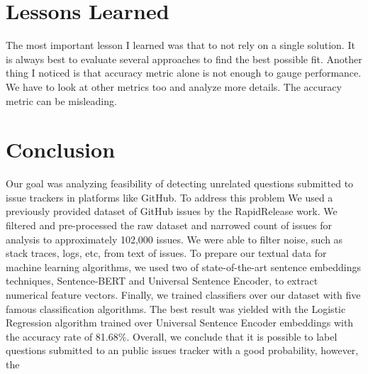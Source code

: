 \documentclass[conference]{IEEEtran}
\begin{document}
\section{Lessons Learned}
The most important lesson I learned was that to not rely on a single solution. It is always best to evaluate several 
approaches to find the best possible fit. Another thing I noticed is that accuracy metric alone is not enough 
to gauge performance. We have to look at other metrics too and analyze more details. The accuracy metric can be 
misleading.

\section{Conclusion}\label{conclusion}
Our goal was analyzing feasibility of detecting unrelated questions submitted to issue trackers in platforms like 
GitHub. To address this problem We used a previously provided dataset of GitHub issues by the RapidRelease work. 
We filtered and pre-processed the raw dataset and narrowed count of issues for analysis to approximately 
102,000 issues. We were able to filter noise, such as stack traces, logs, etc, from text of issues. 
To prepare our textual data for machine learning algorithms, we used two of state-of-the-art sentence embeddings
techniques, Sentence-BERT and Universal Sentence Encoder, to extract numerical feature vectors. Finally, we 
trained classifiers over our dataset with five famous classification algorithms. The best result was yielded
with the Logistic Regression algorithm trained over Universal Sentence Encoder embeddings with the accuracy
rate of 81.68\%. Overall, we conclude that it is possible to label questions submitted to an public issues tracker
with a good probability, however, the 




\vspace{12pt}
\color{red}
\end{document}
